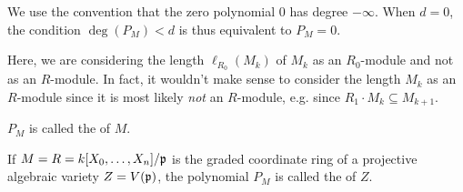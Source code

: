 \documentclass[a4paper,parskip=half,numbers=enddot, DIV=12]{scrreprt}
\begin{document}
\begin{rem*}
	\begin{alphanumerate}
		\item 
		We use the convention that the zero polynomial 0 has degree $-\infty$. When $d=0$, the condition $\deg(P_M) <d$ is thus equivalent to $P_M = 0$.
		\item  Here, we are considering the length $\ell_{R_0}(M_k)$ of $M_k$ as an $R_0$-module and not as an $R$-module. In fact, it wouldn't make sense to consider the length $M_k$ as an $R$-module since it is most likely \emph{not} an $R$-module, e.g. since $R_1\cdot M_k\subseteq M_{k+1}$.
	\end{alphanumerate}
\end{rem*}
\begin{defi}
    $P_M$ is called the  of $M$.
\end{defi}
\begin{defi} 
    If $M=R=k[X_0,\ldots, X_n]/\mathfrak{p}$ is the graded coordinate ring of a projective algebraic variety $Z=V(\mathfrak{p})$, the polynomial $P_M$ is called the  of $Z$.
\end{defi}
\end{document}
